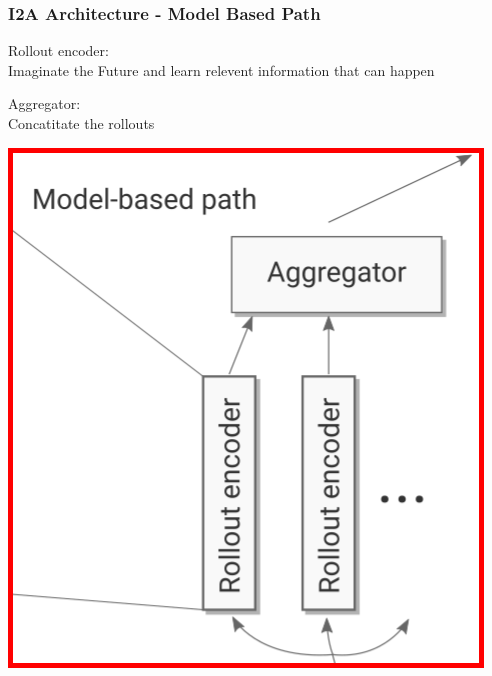 \begin{frame}
    \frametitle{I2A Architecture - Model Based Path}

\begin{multicols}{2}
	\begin{PraesentationAufzaehlung}
	    \item Rollout encoder:\\
		Imaginate the Future and learn relevent information that can happen
		\item Aggregator: \\
		Concatitate the rollouts
	\end{PraesentationAufzaehlung}
    \vfill\columnbreak
	\begin{center}
    \includegraphics[height=.5\textheight]{./Images/i2a_model_based.png}%
	\end{center}
\end{multicols}
    
\end{frame}
\clearpage


